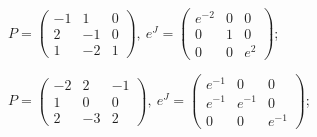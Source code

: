 \begin{enumsols}
		\label{sol:linsys_funcs:exponential_general}
		\item \( P = \begin{pmatrix} -1 & 1 & 0 \\ 2 & -1 & 0 \\ 1 & -2 & 1 \end{pmatrix}, ~ e^{J} = \begin{pmatrix} e^{-2} & 0 & 0 \\ 0 & 1 & 0 \\ 0 & 0 & e^{2} \end{pmatrix} \); %
		\item \( P = \begin{pmatrix} -2 & 2 & -1 \\ 1 & 0 & 0 \\ 2 & -3 & 2 \end{pmatrix}, ~ e^{J} = \begin{pmatrix} e^{-1} & 0 & 0 \\ e^{-1} & e^{-1} & 0 \\ 0 & 0 & e^{-1} \end{pmatrix} \); %

\end{enumsols}
